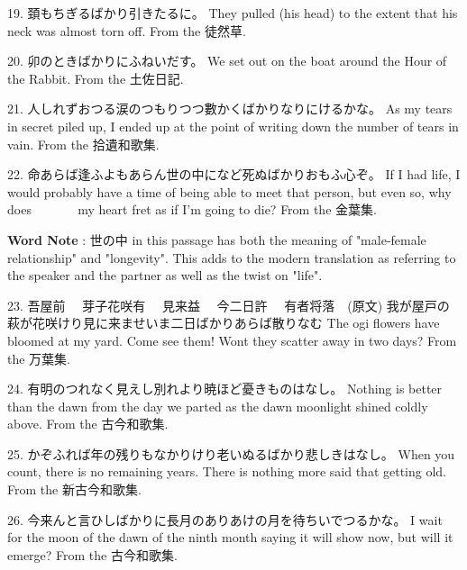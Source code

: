 \par{19. 頚もちぎるばかり引きたるに。 \hfill\break
They pulled (his head) to the extent that his neck was almost torn off. \hfill\break
From the 徒然草. }

\par{20. 卯のときばかりにふねいだす。 \hfill\break
We set out on the boat around the Hour of the Rabbit. \hfill\break
From the 土佐日記. }

\par{21. 人しれずおつる涙のつもりつつ數かくばかりなりにけるかな。 \hfill\break
As my tears in secret piled up, I ended up at the point of writing down the number of tears in vain. \hfill\break
From the 拾遺和歌集. }

\par{22. 命あらば逢ふよもあらん世の中になど死ぬばかりおもふ心ぞ。 \hfill\break
If I had life, I would probably have a time of being able to meet that person, but even so, why does         my heart fret as if I'm going to die? \hfill\break
From the 金葉集. }

\par{\textbf{Word Note }: 世の中 in this passage has both the meaning of "male-female relationship" and "longevity". This adds to the modern translation as referring to the speaker and the partner as well as the twist on "life". }
 
\par{23. 吾屋前 　芽子花咲有 　見来益 　今二日許 　有者将落　(原文) \hfill\break
我が屋戸の萩が花咲けり見に来ませいま二日ばかりあらば散りなむ \hfill\break
The ogi flowers have bloomed at my yard. Come see them! Won\textquotesingle t they scatter away in two days? \hfill\break
From the 万葉集. }

\par{24. 有明のつれなく見えし別れより暁ほど憂きものはなし。 \hfill\break
Nothing is better than the dawn from the day we parted as the dawn moonlight shined coldly above. \hfill\break
From the 古今和歌集. }

\par{25. かぞふれば年の残りもなかりけり老いぬるばかり悲しきはなし。 \hfill\break
When you count, there is no remaining years. There is nothing more said that getting old. \hfill\break
From the 新古今和歌集. }

\par{26. 今来んと言ひしばかりに長月のありあけの月を待ちいでつるかな。 \hfill\break
I wait for the moon of the dawn of the ninth month saying it will show now, but will it emerge? \hfill\break
From the 古今和歌集. }
      
